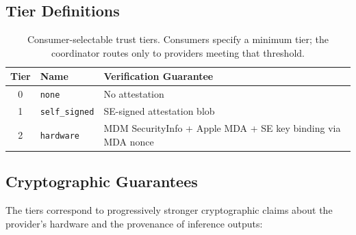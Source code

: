 \documentclass[10pt,twocolumn,letterpaper]{article}
\begin{document}
\subsection{Tier Definitions}

\begin{table}[h]
\centering
\caption{Consumer-selectable trust tiers. Consumers specify a minimum tier; the coordinator routes only to providers meeting that threshold.}
\label{tab:trust-tiers}
\vspace{4pt}
\scriptsize
\begin{tabular}{@{}clp{4.2cm}@{}}
\toprule
\textbf{Tier} & \textbf{Name} & \textbf{Verification Guarantee} \\
\midrule
0 & \texttt{none} & No attestation \\
1 & \texttt{self\_signed} & SE-signed attestation blob \\
2 & \texttt{hardware} & MDM SecurityInfo + Apple MDA + SE key binding via MDA nonce \\
\bottomrule
\end{tabular}
\end{table}

\subsection{Cryptographic Guarantees}

The tiers correspond to progressively stronger cryptographic claims about the provider's hardware and the provenance of inference outputs:
\end{document}
